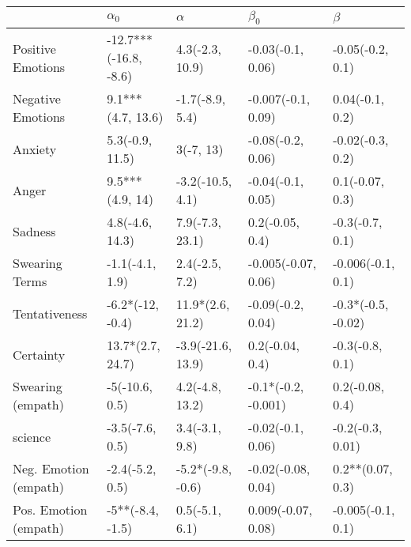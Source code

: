 \begin{tabular}{lllll}
\toprule
{} &             $\alpha_0$ &           $\alpha$ &            $\beta_0$ &             $\beta$ \\
\midrule
Positive Emotions     &  -12.7***(-16.8, -8.6) &    4.3(-2.3, 10.9) &    -0.03(-0.1, 0.06) &    -0.05(-0.2, 0.1) \\
Negative Emotions     &      9.1***(4.7, 13.6) &    -1.7(-8.9, 5.4) &   -0.007(-0.1, 0.09) &     0.04(-0.1, 0.2) \\
Anxiety               &        5.3(-0.9, 11.5) &          3(-7, 13) &    -0.08(-0.2, 0.06) &    -0.02(-0.3, 0.2) \\
Anger                 &        9.5***(4.9, 14) &   -3.2(-10.5, 4.1) &    -0.04(-0.1, 0.05) &     0.1(-0.07, 0.3) \\
Sadness               &        4.8(-4.6, 14.3) &    7.9(-7.3, 23.1) &      0.2(-0.05, 0.4) &     -0.3(-0.7, 0.1) \\
Swearing Terms        &        -1.1(-4.1, 1.9) &     2.4(-2.5, 7.2) &  -0.005(-0.07, 0.06) &   -0.006(-0.1, 0.1) \\
Tentativeness         &       -6.2*(-12, -0.4) &   11.9*(2.6, 21.2) &    -0.09(-0.2, 0.04) &  -0.3*(-0.5, -0.02) \\
Certainty             &       13.7*(2.7, 24.7) &  -3.9(-21.6, 13.9) &      0.2(-0.04, 0.4) &     -0.3(-0.8, 0.1) \\
Swearing (empath)     &         -5(-10.6, 0.5) &    4.2(-4.8, 13.2) &  -0.1*(-0.2, -0.001) &     0.2(-0.08, 0.4) \\
science               &        -3.5(-7.6, 0.5) &     3.4(-3.1, 9.8) &    -0.02(-0.1, 0.06) &    -0.2(-0.3, 0.01) \\
Neg. Emotion (empath) &        -2.4(-5.2, 0.5) &  -5.2*(-9.8, -0.6) &   -0.02(-0.08, 0.04) &    0.2**(0.07, 0.3) \\
Pos. Emotion (empath) &       -5**(-8.4, -1.5) &     0.5(-5.1, 6.1) &   0.009(-0.07, 0.08) &   -0.005(-0.1, 0.1) \\
\bottomrule
\end{tabular}

